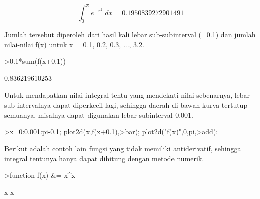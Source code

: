 \documentclass[a4paper,10pt]{article}
\begin{document}
\begin{eulernotebook}
\begin{eulercomment}
\begin{eulercomment}
\begin{eulercomment}
\begin{eulercomment}
\begin{eulercomment}
\end{eulercomment}
\begin{eulerformula}
\[
\int_{0}^{\pi}{e^ {- x^2 }\;dx}=0.1950839272901491
\]
\end{eulerformula}
\begin{eulercomment}
Jumlah tersebut diperoleh dari hasil kali lebar sub-subinterval (=0.1)
dan jumlah nilai-nilai f(x) untuk x = 0.1, 0.2, 0.3, ..., 3.2.
\end{eulercomment}
\begin{eulerprompt}
>0.1*sum(f(x+0.1))
\end{eulerprompt}
\begin{euleroutput}
  0.836219610253
\end{euleroutput}
\begin{eulercomment}
Untuk mendapatkan nilai integral tentu yang mendekati nilai
sebenarnya, lebar sub-intervalnya dapat diperkecil lagi, sehingga
daerah di bawah kurva tertutup semuanya, misalnya dapat digunakan
lebar subinterval 0.001.
\end{eulercomment}
\begin{eulerprompt}
>x=0:0.001:pi-0.1; plot2d(x,f(x+0.1),>bar); plot2d("f(x)",0,pi,>add):
\end{eulerprompt}
\begin{eulercomment}
Berikut adalah contoh lain fungsi yang tidak memiliki antiderivatif,
sehingga integral tentunya hanya dapat dihitung dengan metode numerik.
\end{eulercomment}
\begin{eulerprompt}
>function f(x) &= x^x
\end{eulerprompt}
\begin{euleroutput}
  
                                     x
                                    x
  

\end{euleroutput}
\end{eulercomment}
\end{eulercomment}
\end{eulercomment}
\end{eulercomment}
\end{eulernotebook}
\end{document}
